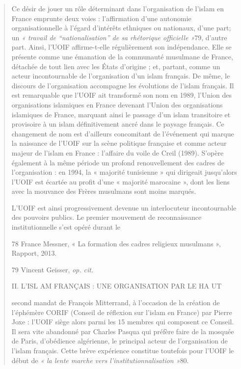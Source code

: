 \begin{quote}
Ce désir de jouer un rôle déterminant dans l'organisation de l'islam en
France emprunte deux voies : l'affirmation d'une autonomie
organisationnelle à l'égard d'intérêts ethniques ou nationaux, d'une
part; un \emph{« travail de ``nationalisation'' de sa rhétorique
officielle »}79, d'autre part. Ainsi, l'UOIF affirme-t-elle
régulièrement son indépendance. Elle se présente comme une émanation de
la communauté musulmane de France, détachée de tout lien avec les États
d'origine ; et, partant, comme un acteur incontournable de
l'organisation d'un islam français. De même, le discours de
l'organisation accompagne les évolutions de l'islam français. Il est
remarquable que l'UOIF ait transformé son nom en 1989, l'Union des
organisations islamiques en France devenant l'Union des organisations
islamiques de France, marquant ainsi le passage d'un islam transitoire
et provisoire à un islam définitivement ancré dans le paysage français.
Ce changement de nom est d'ailleurs concomitant de l'événement qui
marque la naissance de l'UOIF sur la scène politique française et comme
acteur majeur de l'islam en France : l'affaire du voile de Creil (1989).
S'opère également à la même période un profond renouvellement des cadres
de l'organisation : en 1994, la « majorité tunisienne » qui dirigeait
jusqu'alors l'UOIF est écartée au profit d'une « majorité marocaine »,
dont les liens avec la mouvance des Frères musulmans sont moins marqués.

L'UOIF est ainsi progressivement devenue un interlocuteur incontournable
des pouvoirs publics. Le premier mouvement de reconnaissance
institutionnelle s'est opéré durant le

78 France Messner, « La formation des cadres religieux musulmans »,
Rapport, 2013.

79 Vincent Geisser, \emph{op. cit.}

II. L'ISL AM FRANÇAIS : UNE ORGANISATION PAR LE HA UT

second mandat de François Mitterrand, à l'occasion de la création de
l'éphémère CORIF (Conseil de réflexion sur l'islam en France) par Pierre
Joxe : l'UOIF siège alors parmi les 15 membres qui composent ce Conseil.
Il sera vite abandonné par Charles Pasqua qui préfère faire de la
mosquée de Paris, d'obédience algérienne, le principal acteur de
l'organisation de l'islam français. Cette brève expérience constitue
toutefois pour l'UOIF le début de \emph{« la lente marche vers
l'institutionnalisation »}80.


\end{quote}
